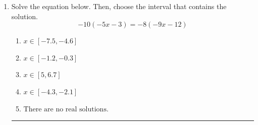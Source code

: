 \documentclass[14pt]{extbook}
\newcommand{\litem}[1]{\item#1\hspace*{-1cm}\rule{\textwidth}{0.4pt}}
\begin{document}
\begin{enumerate}
{\begin{enumerate}[label=\Alph*.]
\end{enumerate} }
\litem{
Solve the equation below. Then, choose the interval that contains the solution.\[ -10(-5x -3) = -8(-9x -12) \]\begin{enumerate}[label=\Alph*.]
\item \( x \in [-7.5, -4.6] \)
\item \( x \in [-1.2, -0.3] \)
\item \( x \in [5, 6.7] \)
\item \( x \in [-4.3, -2.1] \)
\item \( \text{There are no real solutions.} \)

\end{enumerate} }
\end{enumerate}
\end{document}
